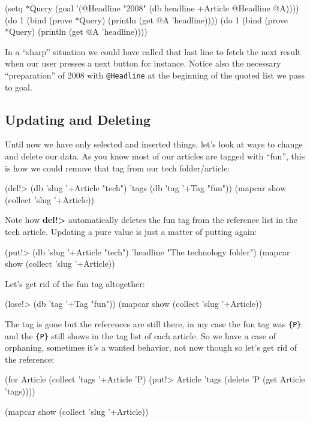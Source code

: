 \begin{wideverbatim}
(setq *Query (goal '(@Headline "2008" (db headline +Article @Headline @A))))
(do 1 (bind (prove *Query) (println (get @A 'headline))))
(do 1 (bind (prove *Query) (println (get @A 'headline))))
\end{wideverbatim}

In a ``sharp'' situation we could have called that last line to fetch
the next result when our user presses a next button for instance.
Notice also the necessary ``preparation'' of 2008 with
\texttt{@Headline} at the beginning of the quoted list we pass to
goal.

\subsection{Updating and Deleting}
\label{sec:advanced-oodb}

Until now we have only selected and inserted things, let's look at ways
to change and delete our data. As you know most of our articles are
tagged with ``fun'', this is how we could remove that tag from our tech
folder/article:


\begin{wideverbatim}
(del!> (db 'slug '+Article "tech") 'tags (db 'tag '+Tag "fun"))
(mapcar show (collect 'slug '+Article))
\end{wideverbatim}

Note how \textbf{del!\textgreater} automatically deletes the fun tag from the reference
list in the tech article. Updating a pure value is just a matter of
putting again:


\begin{wideverbatim}
(put!> (db 'slug '+Article "tech") 'headline "The technology folder")
(mapcar show (collect 'slug '+Article))
\end{wideverbatim}

Let's get rid of the fun tag altogether:


\begin{wideverbatim}
(lose!> (db 'tag '+Tag "fun"))
(mapcar show (collect 'slug '+Article))
\end{wideverbatim}

The tag is gone but the references are still there, in my case the fun
tag was \texttt{\{P\}} and the \texttt{\{P\}} still shows in the tag
list of each article. So we have a case of orphaning, sometimes it's a
wanted behavior, not now though so let's get rid of the reference:

\begin{wideverbatim}
(for Article (collect 'tags '+Article '{P})
     (put!> Article 'tags (delete '{P} (get Article 'tags))))

(mapcar show (collect 'slug '+Article))
\end{wideverbatim}



